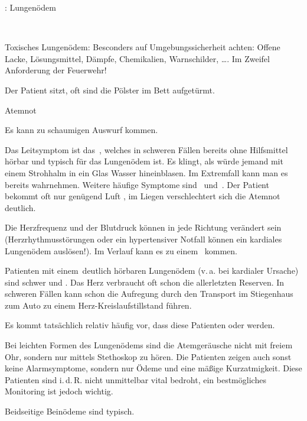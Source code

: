 \documentclass[
ngerman,
paper=a4,
asymmetric,
fontsize=10pt,
draft=false,
numbers=noenddot,
bibtotocnumbered,
footnotes=multiple,
]{scrreprt}
\newcommand{\RedFlag}{{\color{DefaultRed}\scriptsize{\VarFlag}\hspace{-0.5em}}}
\begin{document}
{\TxABCDE: Lungenödem}
 {~
 \begin{ABCDEText}
  \item[\ABCDE{1}] Toxisches Lungenödem: Besconders auf
  Umgebungssicherheit achten: Offene Lacke,
  Lösungsmittel, Dämpfe, Chemikalien, Warnschilder, \ldots.
  Im Zweifel Anforderung der Feuerwehr! 
  \item[\ABCDE{2}] Der Patient sitzt, oft sind die Pölster
  im Bett aufgetürmt.
  \item[\ABCDE{4}] Atemnot
  \item[\ABCDE{A}] Es kann zu schaumigen Auswurf kommen.
  \item[\ABCDE{B}] %
  Das Leitsymptom ist das
  {\RedFlag}\,, welches in
  schweren Fällen bereits ohne Hilfsmittel hörbar und
  typisch für das Lungenödem ist. Es klingt, als würde jemand
  mit einem Strohhalm in ein Glas Wasser hineinblasen. Im
  Extremfall kann man es bereits  wahrnehmen.
  Weitere häufige Symptome sind {\RedFlag}\, und
  {\RedFlag}\,.
  Der Patient bekommt oft nur  genügend
  Luft , im Liegen verschlechtert sich die
  Atemnot deutlich.
  \item[\ABCDE{C}] Die Herzfrequenz und der Blutdruck können
  in jede Richtung verändert sein (Herzrhythmusstörungen
  oder ein hypertensiver Notfall können ein kardiales
  Lungenödem auslösen!). Im Verlauf kann es zu einem
  {\RedFlag}\, kommen.
  \item[\ABCDE{=}] Patienten mit einem {\RedFlag}\,deutlich
  hörbaren Lungenödem (v.\,a. bei kardialer Ursache) sind schwer und . Das Herz verbraucht oft schon die allerletzten Reserven. In
   schweren Fällen kann schon die Aufregung durch den Transport
   im Stiegenhaus zum Auto zu einem Herz-Kreislaufstillstand
   führen.
   
   Es kommt tatsächlich relativ häufig vor, dass diese
   Patienten  oder 
    werden. 
   
   Bei leichten Formen des Lungenödems sind die
   Atemgeräusche nicht mit freiem Ohr, sondern
   nur mittels Stethoskop zu hören.  Die Patienten zeigen auch
   sonst keine Alarmsymptome, sondern nur Ödeme und eine mäßige
   Kurzatmigkeit. Diese Patienten sind i.\,d.\,R. nicht
   unmittelbar vital bedroht, ein bestmögliches Monitoring ist jedoch wichtig.
  \item[\ABCDE{\ldots}] Beidseitige Beinödeme sind typisch.
 \end{ABCDEText}
 }
\end{document}
